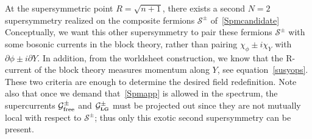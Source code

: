 \documentclass[12pt]{article}
\def\tight#1{\! #1 \!}  %
\numberwithin{equation}{section}
\def\cG{\mathcal {G}} \def\cH{\mathcal {H}} \def\cI{\mathcal {I}}
\def\cS{\mathcal {S}} \def\cT{\mathcal {T}} \def\cU{\mathcal {U}}
\def\sst{\scriptscriptstyle}
\def\exp{{\rm exp}}
\def\LG{{\sst\bf LG}}
\begin{document}
\begin{appendices}
At the supersymmetric point $R=\sqrt{n+1}$, there exists a second $N=2$ supersymmetry realized on the composite fermions $\cS^\pm$ of~\eqref{Spmcandidate}  
\eqn[Spmapp]{
\cS^\pm = \exp\Big[ \pm \frac i2 \Big( -H_3 + a\, Z + \sqrt{\frac2k}\, Y\Big) \Big] ~.
}
Conceptually, we want this other supersymmetry to pair these fermions $\cS^\pm$ with some bosonic currents in the block theory, rather than pairing $\chi_\phi^{~}\tight\pm i\chi_Y^{~}$ with $\partial\phi\tight\pm i\partial Y$.  In addition, from the worldsheet construction, we know that the R-current of the block theory measures momentum along $Y$, see equation~\eqref{susyops}.  These two criteria are enough to determine the desired field redefinition.  Note also that once we demand that~\eqref{Spmapp} is allowed in the spectrum, the supercurrents $\cG^\pm_{\rm free}$ and $\cG^\pm_{\LG}$ must be projected out since they are not mutually local with respect to $\cS^\pm$; thus only this exotic second supersymmetry can be present.


\end{appendices}
\end{document}
